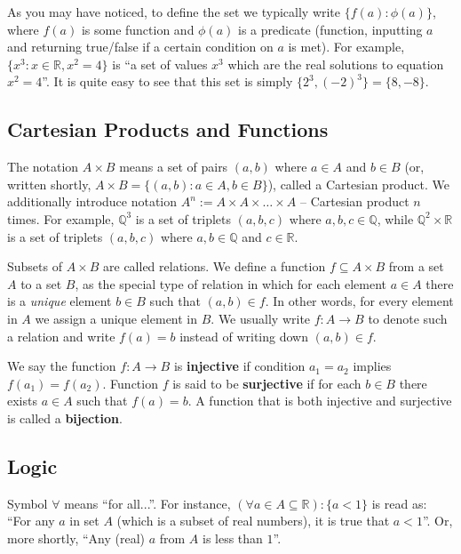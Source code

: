 \documentclass[../../book.tex]{subfiles}
\begin{document}
As you may have noticed, to define the set we typically write $\{f(a): \phi(a)\}$, where $f(a)$ is some 
function and $\phi(a)$ is a predicate (function, inputting $a$ and returning true/false if a certain condition 
on $a$ is met). For example, $\{x^3: x \in \mathbb{R}, x^2 = 4\}$ is ``a set of values $x^3$ which are the real 
solutions to equation $x^2 = 4$''. It is quite easy to see that this set is simply $\{2^3, (-2)^3\} = \{8,-8\}$. 

\subsection{Cartesian Products and Functions}

The notation $A \times B$ means a set of pairs $(a,b)$ where $a \in A$ and $b \in B$ (or, written shortly, 
$A \times B = \{(a,b): a \in A, b \in B\}$), called a Cartesian product. We additionally introduce notation 
$A^n := A \times A \times \dots \times A$ -- Cartesian product $n$ times. For example, $\mathbb{Q}^3$ is a set of triplets 
$(a,b,c)$ where $a,b,c \in \mathbb{Q}$, while $\mathbb{Q}^2 \times \mathbb{R}$ is a set of triplets $(a,b,c)$ where 
$a,b \in \mathbb{Q}$ and $c \in \mathbb{R}$.

Subsets of $ A \times B$ are called relations. We define a function $f \subseteq A
\times B$ from a set $A$ to a set $B$, as the special type of relation in which
for each element $a \in A$ there is a \textit{unique} element $b \in B$ such
that $(a, b) \in f$. In other words, for every element in $A$ we assign a
unique element in $B$. We usually write $f : A \to B$ to denote such a relation
and write $f(a) = b$ instead of writing down $(a,b) \in f$.

We say the function $f : A \to B$ is \textbf{injective} if condition $a_1 = a_2$
implies $f(a_1) = f(a_2)$. Function $f$ is said to be \textbf{surjective} if for
each $b \in B$ there exists $a \in A$ such that $f(a) = b$. A function that is
both injective and surjective is called a \textbf{bijection}.


\subsection{Logic}

Symbol $\forall$ means ``for all...''. For instance, $(\forall a \in A \subseteq \mathbb{R}): \{a < 1\}$ is 
read as: ``For any $a$ in set $A$ (which is a subset of real numbers), it is true that $a<1$''. Or, more shortly, ``Any (real) 
$a$ from $A$ is less than $1$''.
\end{document}
